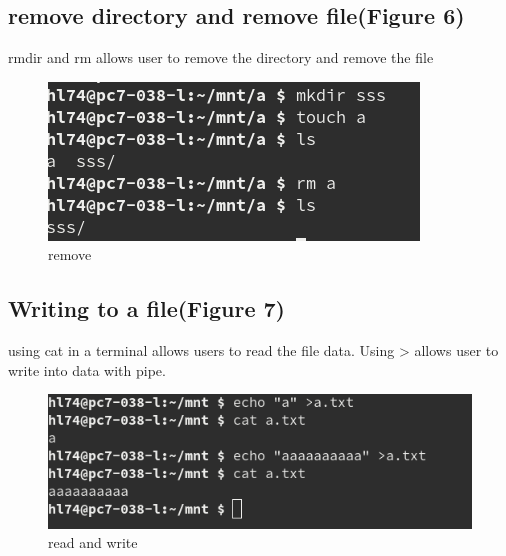 \documentclass[legalpaper]{article}
\begin{document}
	\subsection*{remove directory and remove file(Figure 6)}
	rmdir and rm allows user to remove the directory and remove the file
	\begin{figure}[H]
	\centering
	\includegraphics[width = \textwidth]{rmunlink}
	\caption{remove}
	\end{figure}
	\subsection*{Writing to a file(Figure 7)}
	using cat in a terminal allows users to read the file data. Using > allows user to write into data with pipe.
	\begin{figure}[H]
	\centering
	\includegraphics[width = \textwidth]{write}
	\caption{read and write}
	\end{figure}
\end{document}

